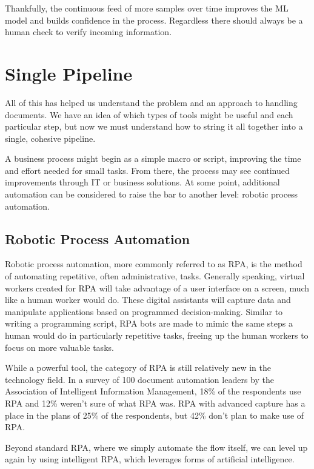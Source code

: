 \documentclass[conference]{IEEEtran}
\begin{document}
Thankfully, the continuous feed of more samples over time improves the ML model and builds confidence in the process. Regardless there should always be a human check to verify incoming information.

\section{Single Pipeline} \label{sectionSinglePipeline}
All of this has helped us understand the problem and an approach to handling documents. We have an idea of which types of tools might be useful and each particular step, but now we must understand how to string it all together into a single, cohesive pipeline.

A business process might begin as a simple macro or script, improving the time and effort needed for small tasks. From there, the process may see continued improvements through IT or business solutions. At some point, additional automation can be considered to raise the bar to another level: robotic process automation.

\subsection{Robotic Process Automation}
Robotic process automation, more commonly referred to as RPA, is the method of automating repetitive, often administrative, tasks. Generally speaking, virtual workers created for RPA will take advantage of a user interface on a screen, much like a human worker would do. These digital assistants will capture data and manipulate applications based on programmed decision-making. Similar to writing a programming script, RPA bots are made to mimic the same steps a human would do in particularly repetitive tasks, freeing up the human workers to focus on more valuable tasks.

While a powerful tool, the category of RPA is still relatively new in the technology field. In a survey of 100 document automation leaders by the Association of Intelligent Information Management, 18\% of the respondents use RPA and 12\% weren't sure of what RPA was. RPA with advanced capture has a place in the plans of 25\% of the respondents, but 42\% don't plan to make use of RPA. \cite{hollander2019survey}

Beyond standard RPA, where we simply automate the flow itself, we can level up again by using intelligent RPA, which leverages forms of artificial intelligence.
\end{document}
